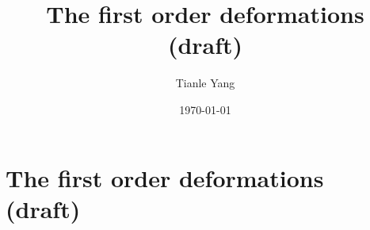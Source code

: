 \documentclass{noteformyself}
\title{The first order deformations (draft)}
\author{Tianle Yang}
\date{\today}
\begin{document}
    \maketitle

    \section{The first order deformations (draft)}



\end{document}
